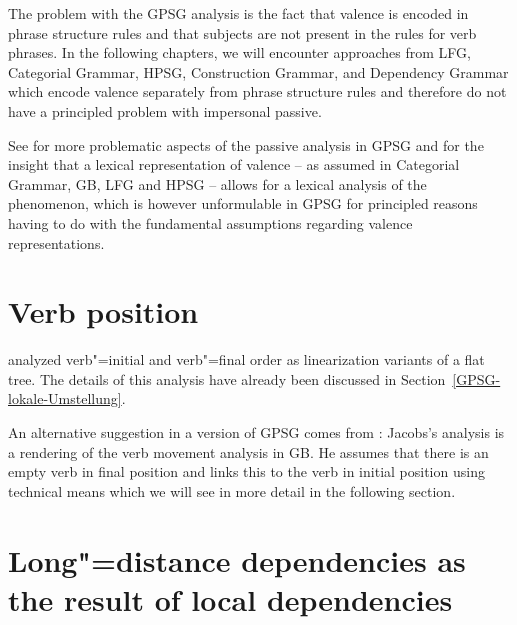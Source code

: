 The problem with the GPSG analysis is the fact that valence is encoded in phrase structure rules and that subjects are not present in the rules
for verb phrases. In the following chapters, we will encounter approaches from LFG\indexlfg,
Categorial Grammar\indexcg, HPSG\indexhpsg, Construction Grammar\indexcxg, and Dependency Grammar\indexdg
which encode valence separately from phrase structure rules and therefore do not have a principled problem with impersonal passive.

See \citet[--396]{Jacobson87b} for more problematic aspects of the passive analysis in GPSG and for the insight that a lexical representation of valence -- as assumed
in Categorial Grammar, GB, LFG and HPSG -- allows for a lexical analysis of the phenomenon, which is however unformulable in GPSG for principled reasons having to
do with the fundamental assumptions regarding valence representations.

\section{Verb position}
\label{Abschnitt-Verbstellung-GPSG}

\mbox{}\citet{Uszkoreit87a} analyzed verb"=initial and verb"=final order as linearization variants of a flat tree. The details of this analysis have already
been discussed in Section~\ref{GPSG-lokale-Umstellung}.

An alternative suggestion in a version of GPSG comes from \citet[]{Jacobs86a}: Jacobs's analysis is a rendering of the verb movement analysis in GB. He assumes that there
is an empty verb in final position and links this to the verb in initial position using technical
means which we will see in more detail in the following section.

\section{Long"=distance dependencies as the result of local dependencies}
\label{Abschnitt-GPSG-Fernabhaengigkeiten}

